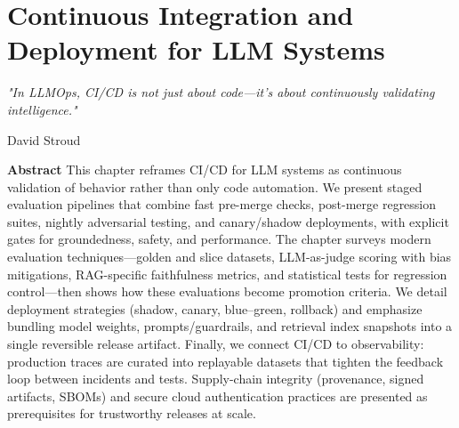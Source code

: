 \chapter{Continuous Integration and Deployment for LLM Systems}
\label{ch:cicd}
\newrefsegment


\epigraph{\emph{"In LLMOps, CI/CD is not just about code—it's about continuously validating intelligence."}}{David Stroud}

\textbf{Abstract} This chapter reframes CI/CD for LLM systems as continuous validation of behavior rather than only code automation. We present staged evaluation pipelines that combine fast pre-merge checks, post-merge regression suites, nightly adversarial testing, and canary/shadow deployments, with explicit gates for groundedness, safety, and performance. The chapter surveys modern evaluation techniques—golden and slice datasets, LLM-as-judge scoring with bias mitigations, RAG-specific faithfulness metrics, and statistical tests for regression control—then shows how these evaluations become promotion criteria. We detail deployment strategies (shadow, canary, blue–green, rollback) and emphasize bundling model weights, prompts/guardrails, and retrieval index snapshots into a single reversible release artifact. Finally, we connect CI/CD to observability: production traces are curated into replayable datasets that tighten the feedback loop between incidents and tests. Supply-chain integrity (provenance, signed artifacts, SBOMs) and secure cloud authentication practices are presented as prerequisites for trustworthy releases at scale.

